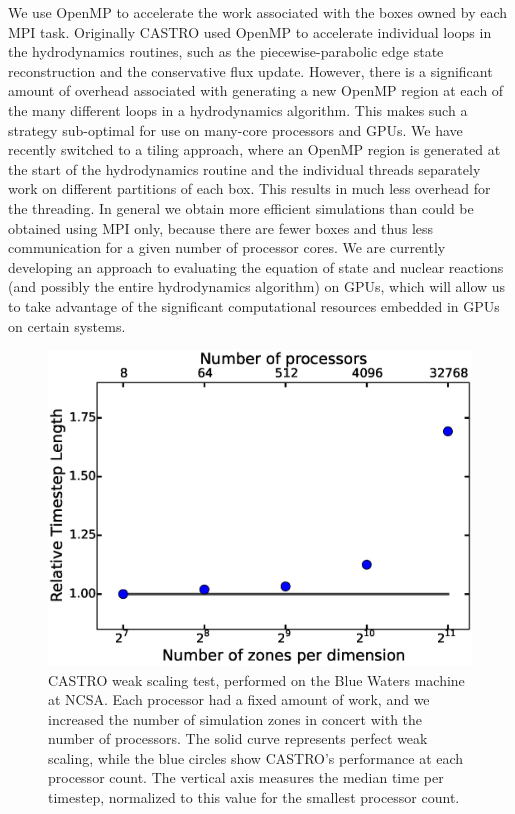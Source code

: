 \documentclass[iop]{emulateapj}
\begin{document}
We use OpenMP to accelerate the work associated with the boxes owned by each 
MPI task. Originally CASTRO used OpenMP to accelerate individual loops in the 
hydrodynamics routines, such as the piecewise-parabolic edge state reconstruction 
and the conservative flux update. However, there is a significant amount of 
overhead associated with generating a new OpenMP region at each of the many 
different loops in a hydrodynamics algorithm. This makes such a strategy 
sub-optimal for use on many-core processors and GPUs. We have recently switched 
to a tiling approach, where an OpenMP region is generated at the start of 
the hydrodynamics routine and the individual threads separately work on 
different partitions of each box. This results in much less overhead for 
the threading. In general we obtain more efficient simulations than 
could be obtained using MPI only, because there are fewer boxes and thus 
less communication for a given number of processor cores. We are currently 
developing an approach to evaluating the equation of state and nuclear reactions 
(and possibly the entire hydrodynamics algorithm) on GPUs, which will allow us
to take advantage of the significant computational resources embedded in GPUs on 
certain systems.

\begin{figure}
  \centering
  \includegraphics[scale=0.4]{plots/weak_scaling}
  \caption{CASTRO weak scaling test, performed on the Blue Waters machine at 
    NCSA. Each processor had a fixed amount of work, and we increased the 
    number of simulation zones in concert with the number of processors. The 
    solid curve represents perfect weak scaling, while the blue circles show 
    CASTRO's performance at each processor count. The vertical axis measures 
    the median time per timestep, normalized to this value for the smallest 
    processor count.\label{fig:weak_scaling}}
\end{figure}
\end{document}
